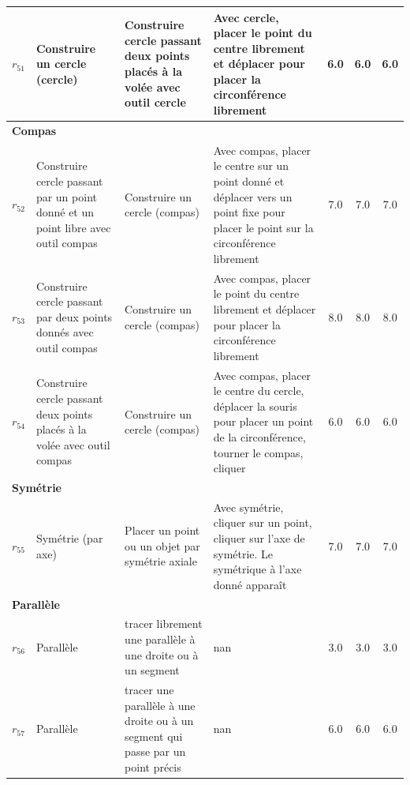 \begin{longtable}{|c|p{3cm}|p{4cm}|p{4cm}|c|c|c|}
$r_{51}$\label{op_cercle_pts_vol_out_cercle} & Construire un cercle (cercle) & Construire cercle passant deux points placés à la volée avec outil cercle & Avec cercle, placer le point du centre librement et déplacer pour placer la circonférence librement & 6.0 & 6.0 & 6.0 \\ \hline
\multicolumn{7}{|l|}{\textbf{Compas}} \\ \hline
$r_{52}$\label{op_cercle_pt_const_pt_vol_out_compas} & Construire cercle passant par un point donné et un point libre avec outil compas & Construire un cercle (compas) & Avec compas, placer le centre sur un point donné et déplacer vers un point fixe pour placer le point sur la circonférence librement & 7.0 & 7.0 & 7.0 \\ \hline
$r_{53}$\label{op_cercle_pts_const_out_compas} & Construire cercle passant par deux points donnés avec outil compas & Construire un cercle (compas) & Avec compas, placer le point du centre librement et déplacer pour placer la circonférence librement & 8.0 & 8.0 & 8.0 \\ \hline
$r_{54}$\label{op_cercle_pts_vol_out_compas} & Construire cercle passant deux points placés à la volée avec outil compas & Construire un cercle (compas) & Avec compas, placer le centre du cercle, déplacer la souris pour placer un point de la circonférence, tourner le compas, cliquer & 6.0 & 6.0 & 6.0 \\ \hline
\multicolumn{7}{|l|}{\textbf{Symétrie}} \\ \hline
$r_{55}$\label{op_sym_axe} & Symétrie (par axe) & Placer un point ou un objet par symétrie axiale & Avec symétrie, cliquer sur un point, cliquer sur l'axe de symétrie. Le symétrique à l'axe donné apparaît & 7.0 & 7.0 & 7.0 \\ \hline
\multicolumn{7}{|l|}{\textbf{Parallèle}} \\ \hline
$r_{56}$\label{op_paral_lib} & Parallèle & tracer librement une parallèle à une droite ou à un segment & nan & 3.0 & 3.0 & 3.0 \\ \hline
$r_{57}$\label{op_para_préc} & Parallèle & tracer une parallèle à une droite ou à un segment qui passe par un point précis & nan & 6.0 & 6.0 & 6.0 \\ \hline
\end{longtable}


